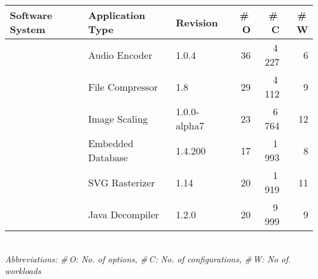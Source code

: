 \begin{tabularx}{\linewidth}{lllrrr}
		\toprule
		\textbf{Software System} &  \textbf{Application Type} & \textbf{Revision} &\textbf{ \#\,O} & \textbf{\#\,C} & \textbf{\#\,W}  \\
		\midrule
		\jumper & Audio Encoder & 1.0.4 & 36 & 4\,227 & 6   \\
		
		\kanzi & File Compressor & 1.8 & 29 & 4\,112 & 9 \\
			
		\dconvert & Image Scaling & 1.0.0-alpha7 & 23 & 6\,764 & 12  \\
				
		\htwo & Embedded Database & 1.4.200 & 17 & 1\,993  & 8  \\
		
		\batik & SVG Rasterizer & 1.14 & 20 & 1\,919 &  11  \\
		
		\jadx & Java Decompiler & 1.2.0 & 20 & 9\,999 & 9  \\
\bottomrule

\end{tabularx}\\
{\vspace{1mm}\textit{Abbreviations: \#\,O: No. of options, \#\,C: No. of configurations, \#\,W: No of. workloads}}
